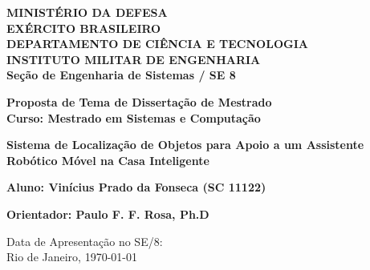 \begin{center}
\textbf{MINISTÉRIO DA DEFESA}\\
\textbf{EXÉRCITO BRASILEIRO}\\
\textbf{DEPARTAMENTO DE CIÊNCIA E TECNOLOGIA}\\
\textbf{INSTITUTO MILITAR DE ENGENHARIA}\\
\textbf{Seção de Engenharia de Sistemas / SE 8}

\vspace{2.5cm}

\begin{large}
\textbf{Proposta de Tema de Dissertação de Mestrado
\\Curso: Mestrado em Sistemas e Computação}

\vspace{1.5cm}

\textbf{Sistema de Localização de Objetos para Apoio a um Assistente Robótico Móvel na Casa Inteligente}

\vspace{1.5cm}

\textbf{Aluno: Vinícius Prado da Fonseca (SC 11122)}

\vspace{1.5cm}

\textbf{Orientador: Paulo F. F. Rosa, Ph.D}

\end{large}

\vspace{2cm}

\begin{small}
Data de Apresentação no SE/8:\\
Rio de Janeiro, \today
\end{small}

\end{center}

\pagebreak
